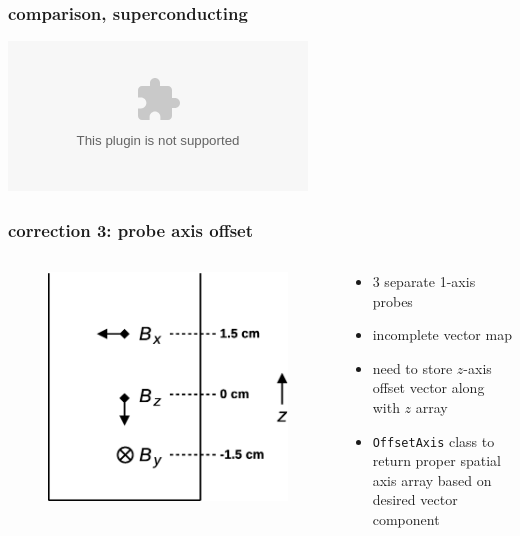 \documentclass{beamer}
\newcommand{\pyplot}{\includegraphics[width=\textwidth, trim=60px 60px 60px 40px]}
\begin{document}
\begin{frame}
\frametitle{comparison, superconducting}

    \begin{center}
    \pyplot{../savedplots/endcapOneBetter.eps}
    \end{center}

\end{frame}

%
%

\begin{frame}
\frametitle{correction 3: probe axis offset}


    \begin{columns}
    
    \begin{column}{0.5\textwidth}
    \begin{figure}
    \includegraphics[width=\textwidth]
    {figures/probe.eps}
    \end{figure}
    \end{column}
    
    \begin{column}{0.5\textwidth}
    \begin{itemize}
        \item 3 separate 1-axis probes \pause
        \item incomplete vector map \pause
        \item need to store $z$-axis offset vector along with $z$ array \pause
        \item \texttt{OffsetAxis} class to return proper spatial axis array based
        on desired vector component
    \end{itemize}
    \end{column}
   


\end{columns}
\end{frame}
\end{document}
